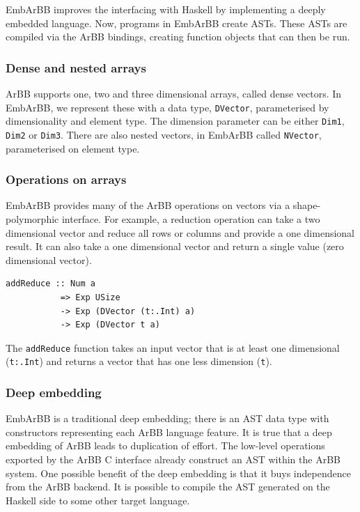 \documentclass[a4paper]{book}
\begin{document}
EmbArBB improves the interfacing with Haskell by implementing a deeply embedded language. 
Now, programs in EmbArBB create ASTs. These ASTs are compiled via the ArBB bindings, creating 
function objects that can then be run. 

\subsubsection{Dense and nested arrays}

ArBB supports one, two and three dimensional arrays, called dense vectors. In \\ EmbArBB, we 
represent these with a data type, {\tt DVector}, parameterised by dimensionality and 
element type. The dimension parameter can be either {\tt Dim1}, {\tt Dim2} or {\tt Dim3}. 
There are also nested vectors, in EmbArBB called {\tt NVector}, parameterised on element type. 

\subsubsection{Operations on arrays} 

EmbArBB provides many of the ArBB operations on vectors via a 
shape-polymorphic interface. For example, a reduction operation can take a two  
dimensional vector and reduce all rows or columns and provide a one dimensional result. 
It can also take a one dimensional vector and return a single value (zero dimensional vector). 

\begin{verbatim} 
addReduce :: Num a 
           => Exp USize 
           -> Exp (DVector (t:.Int) a) 
           -> Exp (DVector t a) 
\end{verbatim} 

The {\tt addReduce} function takes an input vector that is at least one dimensional 
({\tt t:.Int}) and returns a vector that has one less dimension ({\tt t}).
 
\subsubsection{Deep embedding}

EmbArBB is a traditional deep embedding; there is an AST data type with constructors 
representing each ArBB language feature. It is true that a deep embedding of ArBB 
leads to duplication of effort. The low-level operations exported by the 
ArBB C interface already construct an AST within the ArBB system. One possible benefit 
of the deep embedding is that it buys independence from the ArBB backend. It is possible 
to compile the AST generated on the Haskell side to some other target language. 
\end{document}
